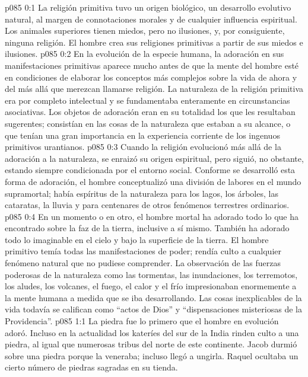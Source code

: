 \author{Brillante estrella vespertina}
\vs p085 0:1 La religión primitiva tuvo un origen biológico, un desarrollo evolutivo natural, al margen de connotaciones morales y de cualquier influencia espiritual. Los animales superiores tienen miedos, pero no ilusiones, y, por consiguiente, ninguna religión. El hombre crea sus religiones primitivas a partir de sus miedos e ilusiones.
\vs p085 0:2 En la evolución de la especie humana, la adoración en sus manifestaciones primitivas aparece mucho antes de que la mente del hombre esté en condiciones de elaborar los conceptos más complejos sobre la vida de ahora y del más allá que merezcan llamarse religión. La naturaleza de la religión primitiva era por completo intelectual y se fundamentaba enteramente en circunstancias asociativas. Los objetos de adoración eran en su totalidad los que les resultaban sugerentes; consistían en las cosas de la naturaleza que estaban a su alcance, o que tenían una gran importancia en la experiencia corriente de los ingenuos primitivos urantianos.
\vs p085 0:3 Cuando la religión evolucionó más allá de la adoración a la naturaleza, se enraizó su origen espiritual, pero siguió, no obstante, estando siempre condicionada por el entorno social. Conforme se desarrolló esta forma de adoración, el hombre conceptualizó una división de labores en el mundo supramortal; había espíritus de la naturaleza para los lagos, los árboles, las cataratas, la lluvia y para centenares de otros fenómenos terrestres ordinarios.
\vs p085 0:4 En un momento o en otro, el hombre mortal ha adorado todo lo que ha encontrado sobre la faz de la tierra, inclusive a sí mismo. También ha adorado todo lo imaginable en el cielo y bajo la superficie de la tierra. El hombre primitivo temía todas las manifestaciones de poder; rendía culto a cualquier fenómeno natural que no pudiese comprender. La observación de las fuerzas poderosas de la naturaleza como las tormentas, las inundaciones, los terremotos, los aludes, los volcanes, el fuego, el calor y el frío impresionaban enormemente a la mente humana a medida que se iba desarrollando. Las cosas inexplicables de la vida todavía se califican como “actos de Dios” y “dispensaciones misteriosas de la Providencia”.
\vs p085 1:1 La piedra fue lo primero que el hombre en evolución adoró. Incluso en la actualidad los kateríes del sur de la India rinden culto a una piedra, al igual que numerosas tribus del norte de este continente. Jacob durmió sobre una piedra porque la veneraba; incluso llegó a ungirla. Raquel ocultaba un cierto número de piedras sagradas en su tienda.

